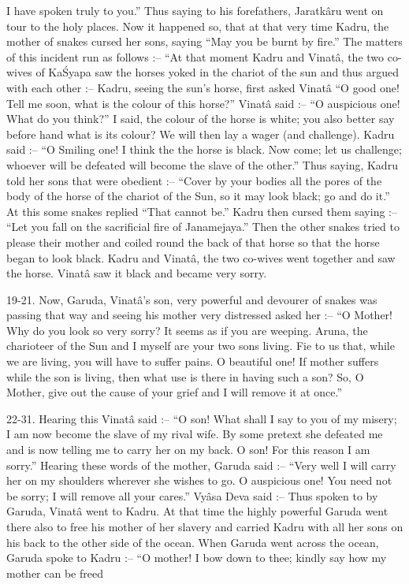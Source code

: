 I have spoken truly to you.'' Thus saying to his forefathers, Jaratk\^aru went on tour to the holy places. Now it happened so, that at that very time Kadru, the mother of snakes cursed her sons, saying ``May you be burnt by fire.'' The matters of this incident run as follows :-- ``At that moment Kadru and Vinat\^a, the two co-wives of Ka\'Syapa saw the horses yoked in the chariot of the sun and thus argued with each other :-- Kadru, seeing the sun's horse, first asked Vinat\^a ``O good one! Tell me soon, what is the colour of this horse?'' Vinat\^a said :-- ``O auspicious one! What do you think?'' I said, the colour of the horse is white; you also better say before hand what is its colour? We will then lay a wager (and challenge). Kadru said :-- ``O Smiling one! I think the the horse is black. Now come; let us challenge; whoever will be defeated will become the slave of the other.'' Thus saying, Kadru told her sons that were obedient :-- ``Cover by your bodies all the pores of the body of the horse of the chariot of the Sun, so it may look black; go and do it.'' At this some snakes replied ``That cannot be.'' Kadru then cursed them saying :-- ``Let you fall on the sacrificial fire of Janamejaya.'' Then the other snakes tried to please their mother and coiled round the back of that horse so that the horse began to look black. Kadru and Vinat\^a, the two co-wives went together and saw the horse. Vinat\^a saw it black and became very sorry.

19-21. Now, Garuda, Vinat\^a's son, very powerful and devourer of snakes was passing that way and seeing his mother very distressed asked her :-- ``O Mother! Why do you look so very sorry? It seems as if you are weeping. Aruna, the charioteer of the Sun and I myself are your two sons living. Fie to us that, while we are living, you will have to suffer pains. O beautiful one! If mother suffers while the son is living, then what use is there in having such a son? So, O Mother, give out the cause of your grief and I will remove it at once.''

22-31. Hearing this Vinat\^a said :-- ``O son! What shall I say to you of my misery; I am now become the slave of my rival wife. By some pretext she defeated me and is now telling me to carry her on my back. O son! For this reason I am sorry.'' Hearing these words of the mother, Garuda said :-- ``Very well I will carry her on my shoulders wherever she wishes to go. O auspicious one! You need not be sorry; I will remove all your cares.'' Vy\^asa Deva said :-- Thus spoken to by Garuda, Vinat\^a went to Kadru. At that time the highly powerful Garuda went there also to free his mother of her slavery and carried Kadru with all her sons on his back to the other side of the ocean. When Garuda went across the ocean, Garuda spoke to Kadru :-- ``O mother! I bow down to thee; kindly say how my mother can be freed

